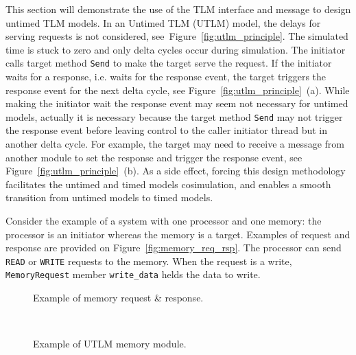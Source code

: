 This section will demonstrate the use of the TLM interface and message
to design untimed TLM models. In an Untimed TLM (UTLM) model, the
delays for serving requests is not considered,
see~Figure~\ref{fig:utlm_principle}. The simulated time is stuck to
zero and only delta cycles occur during simulation. The initiator
calls target method \texttt{Send} to make the target serve the
request. If the initiator waits for a response, i.e. waits for the
response event, the target triggers the response event for the next
delta cycle, see Figure~\ref{fig:utlm_principle}~(a). While making the initiator wait the response
  event may seem not necessary for untimed models, actually it is necessary
  because the target method \texttt{Send} may not trigger the response
  event before leaving control to the caller initiator thread
  but in another delta cycle. For example, the target may need to receive a
  message from another module to set the response and trigger the
  response event, see Figure~\ref{fig:utlm_principle}~(b).
  As a side effect, forcing this design methodology facilitates the untimed
  and timed models cosimulation, and enables a smooth transition from untimed models to
  timed models.

Consider the example of a system
with one processor and one memory: the processor is an initiator
whereas the memory is a target. Examples of request and response are
provided on Figure~\ref{fig:memory_req_rsp}. The processor can send
\texttt{READ} or \texttt{WRITE} requests to the memory. When the
request is a write, \texttt{MemoryRequest} member \texttt{write\_data}
helds the data to write.

\begin{figure}[p]
\begin{minipage}{\textwidth}
  \begin{center}
    
    \caption{\label{fig:memory_req_rsp} Example of memory request \& response.}
  \end{center}
\end{minipage}
\begin{minipage}{\textwidth}
~\vspace{3.0cm}
\end{minipage}
\begin{minipage}{\textwidth}
  \begin{center}
    
    \caption{\label{fig:utlm_memory} Example of UTLM memory module.}
  \end{center}
\end{minipage}
\end{figure}

